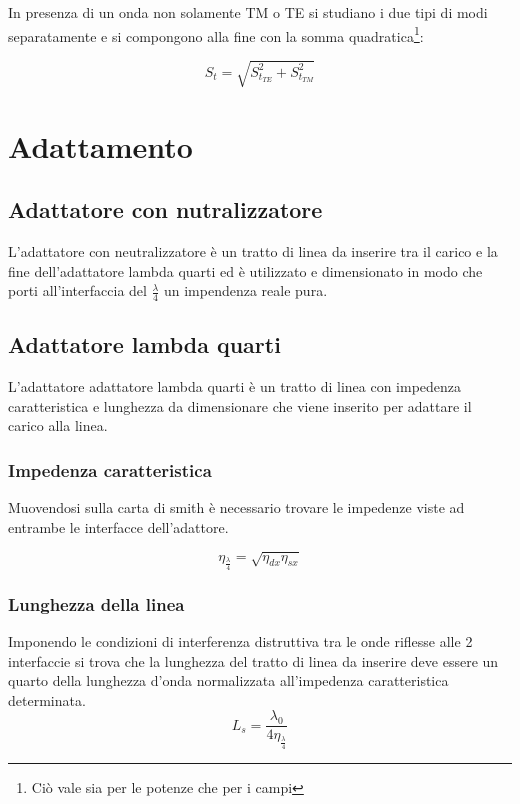 \documentclass[10pt,a4paper]{report}
\begin{document}
		In presenza di un onda non solamente TM o TE si studiano i due tipi di modi separatamente e si compongono alla fine con la somma quadratica\footnote{Ciò vale sia per le potenze che per i campi}:

		\[
		S_{t}=\sqrt{S_{t_{TE}}^2 +S_{t_{TM}}^2 }
		\]

\chapter{Adattamento}

	\section{Adattatore con nutralizzatore}

		L'adattatore con neutralizzatore è un tratto di linea da inserire tra il carico e la fine dell'adattatore lambda quarti ed è utilizzato e dimensionato in modo che porti all'interfaccia del $\frac{\lambda}{4}$ un impendenza reale pura.

	\section{Adattatore lambda quarti}
		
		L'adattatore adattatore lambda quarti è un tratto di linea con impedenza caratteristica e lunghezza da dimensionare che viene inserito per adattare il carico alla linea.

		\subsection{Impedenza caratteristica}
				Muovendosi sulla carta di smith è necessario trovare le impedenze viste ad entrambe le interfacce dell'adattore.

				\begin{equation}
				\eta_{\frac{\lambda}{4}}=\sqrt{\eta_{dx}\eta_{sx}}
				\end{equation}

		\subsection{Lunghezza della linea}
				Imponendo le condizioni di interferenza distruttiva tra le onde riflesse alle 2 interfaccie si trova che la lunghezza del tratto di linea da inserire deve essere un quarto della lunghezza d'onda normalizzata all'impedenza caratteristica determinata.
				\begin{equation}
				L_s=\frac{\lambda_0}{4\eta_{\frac{\lambda}{4}}}
				\end{equation}
\end{document}
